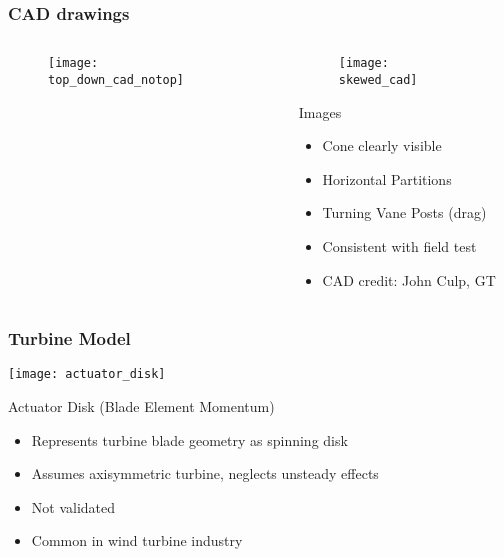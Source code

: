 \documentclass[mathserif]{beamer}
\begin{document}
%
%
%
\begin{frame}
 \frametitle{CAD drawings}

 \begin{columns}[]
  \begin{column}{0.55\linewidth}

    \begin{figure}[htb]
     \centering
     \texttt{[image: top\_down\_cad\_notop]}
    \end{figure}

  \end{column}
   \begin{column}{0.45\linewidth}

    \begin{figure}[htb]
     \centering
     \texttt{[image: skewed\_cad]}
    \end{figure}

    \begin{block}{Images}
     \begin{itemize}
      \item Cone clearly visible
      \item Horizontal Partitions
      \item Turning Vane Posts (drag)
      \item Consistent with field test 
      \item CAD credit: John Culp, GT
     \end{itemize}
     \end{block}

   \end{column}
 \end{columns}

\end{frame}

%
%
%
\begin{frame}
 \frametitle{Turbine Model}

 \begin{center}
  \texttt{[image: actuator\_disk]}
 \end{center}
 
 \begin{block}{Actuator Disk (Blade Element Momentum)}
   \begin{itemize}
   \item Represents turbine blade geometry as spinning disk
   \item Assumes axisymmetric turbine, neglects unsteady effects
   \item Not validated
   \item Common in wind turbine industry
   \end{itemize}
 \end{block}
 
\end{frame}
\end{document}
